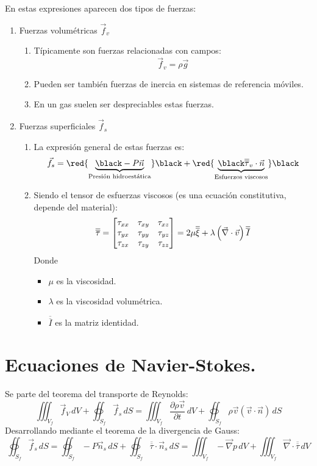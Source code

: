 En estas expresiones aparecen dos tipos de fuerzas:
\begin{enumerate}
	\item Fuerzas volumétricas $\vec{f}_v$
	\begin{enumerate}
		\item Típicamente son fuerzas relacionadas con campos:
		\[\vec{f}_v=\rho \vec{g}\]
		\item Pueden ser también fuerzas de inercia en sistemas de referencia móviles.
		\item En un gas suelen ser despreciables estas fuerzas.
	\end{enumerate}
	\item Fuerzas superficiales $\vec{f}_s$
	
	\begin{enumerate}
		\item La expresión general de estas fuerzas es:
		\[\vec{f}_s=
		\red{\underbrace{\black -P\vec{n}}_{\text{Presión hidroestática}}}\black
		+
		\red{\underbrace{\black \overline{\overline{\tau}}_v\cdot\vec{n}}_{\text{Esfuerzos viscosos}}}\black
		\]
		\item Siendo el tensor de esfuerzas viscosos (es una ecuación constitutiva, depende del material):
		\[
		\overline{\overline{\tau}}=
		\renewcommand{\arraystretch}{1}
		\begin{bmatrix}
			\tau_{xx} & \tau_{xy} & \tau_{xz}\\
			\tau_{yx} & \tau_{yy} & \tau_{yz}\\	
			\tau_{zx} & \tau_{zy} & \tau_{zz}\\
		\end{bmatrix}
		=2\mu \overline{\overline{\xi}} + \lambda \left(\vec{\nabla}\cdot \vec{v}\right)\overline{\overline{I}}
		\]
		Donde \begin{itemize}
			\item $\mu$ es la viscosidad.
			\item $\lambda$ es la viscosidad volumétrica.
			\item $\overline{\overline{I}}$ es la matriz identidad.
		\end{itemize}
	\end{enumerate}
\end{enumerate}
\section{Ecuaciones de Navier-Stokes.}
Se parte del teorema del transporte de Reynolds:
\begin{equation}
	\label{NS1}
\iiint_{V_f}\vec{f}_V\,dV
+
\oiint_{S_f}\vec{f}_s\,dS
=
\iiint_{V_f}\dfrac{\partial \rho\vec{v}}{\partial t}\,dV
+
\oiint_{S_f}\rho\vec{v}\left(\vec{v}\cdot\vec{n}\right)\,dS
\end{equation}
Desarrollando mediante el teorema de la divergencia de Gauss:
\begin{equation}
	\label{NS2}
	\oiint_{S_f}\vec{f}_s\,dS
	=
	\oiint_{S_f}-P\vec{n}_s\,dS
	+
	\oiint_{S_f}\overline{\overline{\tau}}\cdot\vec{n}_s\,dS
	=
	\iiint_{V_f}-\vec{\nabla}p\,dV
	+
	\iiint_{V_f}\vec{\nabla}\cdot\overline{\overline{\tau}}\,dV
\end{equation}

